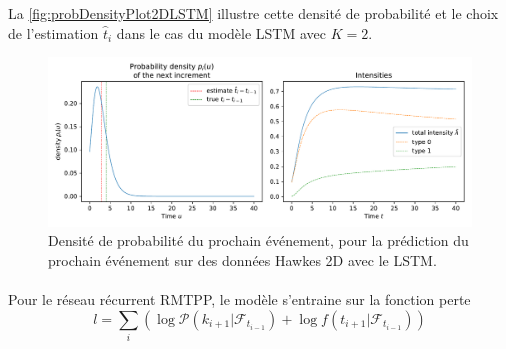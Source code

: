 \documentclass[../main.tex]{subfiles}
\begin{document}
La \autoref{fig:probDensityPlot2DLSTM} illustre cette densité de probabilité et le choix de l'estimation $\hat{t}_i$ dans le cas du modèle LSTM avec $K=2$.

\begin{figure}[!ht]
	\centering
	\includegraphics[width=\linewidth]{../notebooks/lstm_2d_prediction_graphs.pdf}
	\caption{Densité de probabilité du prochain événement, pour la prédiction du prochain événement sur des données Hawkes 2D avec le LSTM.}\label{fig:probDensityPlot2DLSTM}
\end{figure}

\paragraph{}
Pour le réseau récurrent RMTPP, le modèle s'entraine sur la fonction perte
\begin{equation}
l =  \sum_i(\log\mathcal{P}(k_{i+1} | \mathcal{F}_{t_{i-1}}) + \log f(t_{i+1}|  \mathcal{F}_{t_{i-1}}   )  )
\end{equation}
\end{document}
